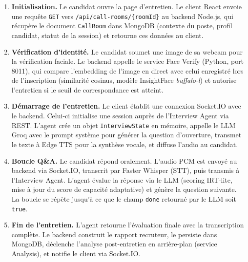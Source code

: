 \begin{sloppypar}
\begin{enumerate}
  \item \textbf{Initialisation.} Le candidat ouvre la page d'entretien. Le client React envoie
        une requête \texttt{GET} vers \texttt{/api/call-rooms/\{roomId\}} au backend Node.js,
        qui récupère le document \texttt{CallRoom} dans MongoDB (contexte du poste, profil
        candidat, statut de la session) et retourne ces données au client.

  \item \textbf{Vérification d'identité.} Le candidat soumet une image de sa webcam pour
        la vérification faciale. Le backend appelle le service Face Verify (Python, port 8011),
        qui compare l'embedding de l'image en direct avec celui enregistré lors de l'inscription
        (similarité cosinus, modèle InsightFace \textit{buffalo-l}) et autorise l'entretien
        si le seuil de correspondance est atteint.

  \item \textbf{Démarrage de l'entretien.} Le client établit une connexion Socket.IO avec le
        backend. Celui-ci initialise une session auprès de l'Interview Agent via REST. L'agent
        crée un objet \texttt{InterviewState} en mémoire, appelle le LLM Groq avec le prompt
        système pour générer la question d'ouverture, transmet le texte à Edge TTS pour la
        synthèse vocale, et diffuse l'audio au candidat.

  \item \textbf{Boucle Q\&A.} Le candidat répond oralement. L'audio PCM est envoyé au backend
        via Socket.IO, transcrit par Faster Whisper (STT), puis transmis à l'Interview Agent.
        L'agent évalue la réponse via le LLM (scoring IRT-lite, mise à jour du score de
        capacité adaptative) et génère la question suivante. La boucle se répète jusqu'à ce
        que le champ \texttt{done} retourné par le LLM soit \texttt{true}.

  \item \textbf{Fin de l'entretien.} L'agent retourne l'évaluation finale avec la transcription
        complète. Le backend construit le rapport recruteur, le persiste dans MongoDB, déclenche
        l'analyse post-entretien en arrière-plan (service Analysis), et notifie le client via
        Socket.IO.
\end{enumerate}
\end{sloppypar}

